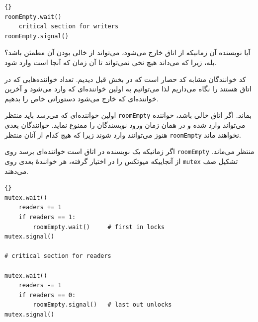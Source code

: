\documentclass{book}
\begin{document}
\begin{latin}
\begin{latin}
\begin{lstlisting}[title=\rl{ راه حل  نویسندگان}]{}
roomEmpty.wait()
    critical section for writers
roomEmpty.signal()
\end{lstlisting}
\end{latin}
\end{latin}

    آیا نویسنده آن زمانیکه از اتاق خارج می‌شود، می‌تواند از خالی بودن آن مطمئن باشد؟
    بله، زیرا که می‌داند هیچ نخی نمی‌تواند تا آن زمان که آنجا است وارد شود. 

    کد خوانندگان مشابه کد حصار است که در بخش قبل دیدیم. تعداد خواننده‌هایی که در اتاق هستند را نگاه می‌داریم لذا می‌توانیم به 
    اولین خواننده‌ای که وارد می‌شود و آخرین خواننده‌ای که خارج می‌شود دستوراتی خاص را بدهیم. 

    اولین خواننده‌ای که می‌رسد باید منتظر  {\tt roomEmpty} بماند. اگر اتاق خالی باشد،‌ خواننده می‌تواند وارد شده و در همان زمان 
    ورود نویسندگان را ممنوع نماید. خوانندگان بعدی هنوز می‌توانند وارد شوند زیرا که هیچ کدام از آنان منتظر  {\tt roomEmpty} نخواهند ماند. 

    اگر زمانیکه یک نویسنده در اتاق است خواننده‌ای برسد روی {\tt roomEmpty} منتظر می‌ماند. از آنجاییکه 
    میوتکس را در اختیار گرفته، هر خوانندهٔ بعدی روی  {\tt mutex} تشکیل صف می‌دهند. 
\begin{latin}
\begin{latin}
\begin{lstlisting}[title=\rl{راه حل خوانندگان}]{}
mutex.wait()
    readers += 1
    if readers == 1:
        roomEmpty.wait()     # first in locks
mutex.signal()

# critical section for readers

mutex.wait()
    readers -= 1
    if readers == 0:
        roomEmpty.signal()   # last out unlocks
mutex.signal()
\end{lstlisting}
\end{latin}
\end{latin}
\end{document}
